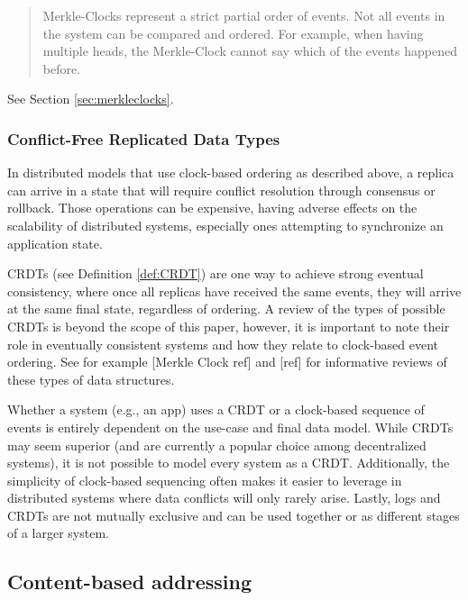 \documentclass{comjnl}
\begin{document}
\begin{quote}
Merkle-Clocks represent a strict partial order of events. Not all events in the system can be compared and ordered. For example, when having multiple heads, the Merkle-Clock cannot say which of the events happened before.
\end{quote}

See Section \ref{sec:merkleclocks}.

\subsubsection{Conflict-Free Replicated Data Types}

In distributed models that use clock-based ordering as described above, a replica can arrive in a state that will require conflict resolution through consensus or rollback. Those operations can be expensive, having adverse effects on the scalability of distributed systems, especially ones attempting to synchronize an application state. 

CRDTs (see Definition \ref{def:CRDT}) are one way to achieve strong eventual consistency, where once all replicas have received the same events, they will arrive at the same final state, regardless of ordering. A review of the types of possible CRDTs is beyond the scope of this paper, however, it is important to note their role in eventually consistent systems and how they relate to clock-based event ordering. See for example [Merkle Clock ref] and [ref] for informative reviews of these types of data structures.

Whether a system (e.g., an app) uses a CRDT or a clock-based sequence of events is entirely dependent on the use-case and final data model. While CRDTs may seem superior (and are currently a popular choice among decentralized systems), it is not possible to model every system as a CRDT. Additionally, the simplicity of clock-based sequencing often makes it easier to leverage in distributed systems where data conflicts will only rarely arise. Lastly, logs and CRDTs are not mutually exclusive and can be used together or as different stages of a larger system.

\subsection{Content-based addressing}
\end{document}
